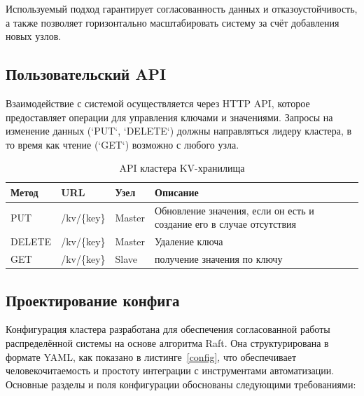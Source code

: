 Используемый подход гарантирует согласованность данных и отказоустойчивость, а также
позволяет горизонтально масштабировать систему за счёт добавления новых узлов.

\subsection{Пользовательский API}

Взаимодействие с системой осуществляется через HTTP API, которое предоставляет операции
для управления ключами и значениями. Запросы на изменение данных (`PUT`, `DELETE`)
должны направляться лидеру кластера, в то время как чтение (`GET`) возможно с любого
узла.

\begin{table}[h]
    \centering
    \caption{API кластера KV-хранилища}
    \label{tab:tab1}
    \begin{tabular}{|l|l|l|m{10cm}|}\hline
    \textbf{Метод} & \textbf{URL}       & \textbf{Узел} & \textbf{Описание} \\ \hline
    PUT            & /kv/\{key\}       & Master         & Обновление значения, если он есть и
                                                          создание его в случае отсутствия \\ \hhline{~---}
    DELETE         & /kv/\{key\}       & Master         & Удаление ключа   \\ \hhline{----}
    GET           & /kv/\{key\}       & Slave        & получение значения по ключу     \\ \hline
    \end{tabular}
\end{table}

\subsection{Проектирование конфига}

Конфигурация кластера разработана для обеспечения согласованной работы распределённой
системы на основе алгоритма Raft. Она структурирована в формате YAML, как показано в
листинге~\ref{config}, что обеспечивает человекочитаемость и простоту интеграции с
инструментами автоматизации. Основные разделы и поля конфигурации обоснованы следующими
требованиями:

